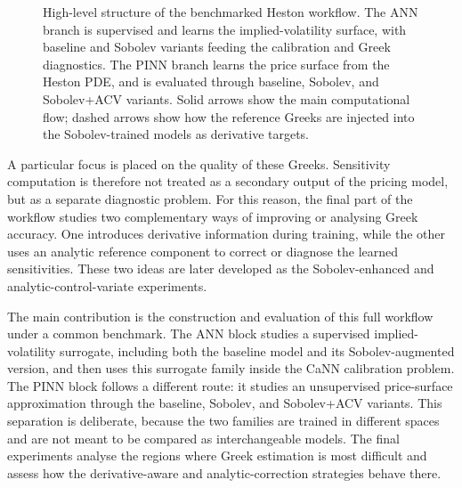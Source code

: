 \begin{figure}[H]
{}
    \caption{High-level structure of the benchmarked Heston workflow. The ANN branch is supervised and learns the implied-volatility surface, with baseline and Sobolev variants feeding the calibration and Greek diagnostics. The PINN branch learns the price surface from the Heston PDE, and is evaluated through baseline, Sobolev, and Sobolev+ACV variants. Solid arrows show the main computational flow; dashed arrows show how the reference Greeks are injected into the Sobolev-trained models as derivative targets.}
    \label{fig:intro_pipeline}
\end{figure}

A particular focus is placed on the quality of these Greeks.
Sensitivity computation is therefore not treated as a secondary output of the pricing model, but as a separate diagnostic problem. 
For this reason, the final part of the workflow studies two complementary ways of improving or analysing Greek accuracy. 
One introduces derivative information during training, while the other uses an analytic reference component to correct or diagnose the learned sensitivities. 
These two ideas are later developed as the Sobolev-enhanced and analytic-control-variate experiments. 


The main contribution is the construction and evaluation of this full workflow under a common benchmark.
The ANN block studies a supervised implied-volatility surrogate, including both the baseline model and its Sobolev-augmented version, and then uses this surrogate family inside the CaNN calibration problem.
The PINN block follows a different route: it studies an unsupervised price-surface approximation through the baseline, Sobolev, and Sobolev+ACV variants.
This separation is deliberate, because the two families are trained in different spaces and are not meant to be compared as interchangeable models.
The final experiments analyse the regions where Greek estimation is most difficult and assess how the derivative-aware and analytic-correction strategies behave there.


